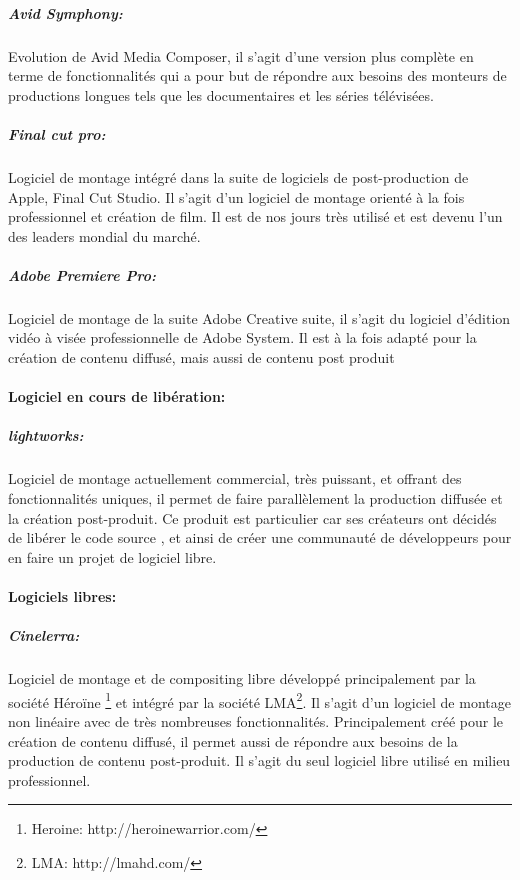 \subparagraph{Avid Symphony:}

Evolution de Avid Media Composer, il s'agit d'une version plus complète
en terme de fonctionnalités qui a pour but de répondre aux besoins
des monteurs de productions longues tels que les documentaires et les
séries télévisées.

\subparagraph{Final cut pro:}

Logiciel de montage intégré dans la suite de logiciels de
post-production de Apple, Final Cut Studio. Il s'agit d'un logiciel
de montage orienté à la fois professionnel et création de film. Il
est de nos jours très utilisé et est devenu l'un des leaders mondial
du marché.

\subparagraph{Adobe Premiere Pro:}

Logiciel de montage de la suite Adobe Creative suite, il s'agit du
logiciel d'édition vidéo à visée professionnelle de Adobe System. Il
est à la fois adapté pour la création de contenu diffusé, mais aussi
de contenu post produit

\paragraph {Logiciel en cours de libération:}

\subparagraph{lightworks:}

Logiciel de montage actuellement commercial, très puissant, et offrant
des fonctionnalités uniques, il permet de faire parallèlement la
production diffusée et la création post-produit. Ce produit est
particulier car ses créateurs ont décidés de libérer le code source
\cite{TheLightworksOpenSourceProjectStartHere}, et ainsi  de créer une
communauté de développeurs pour en faire un projet de logiciel libre.

\paragraph {Logiciels libres:}

\subparagraph{Cinelerra:}

Logiciel de montage et de compositing libre développé principalement
par la société Héroïne \footnote{Heroine: http://heroinewarrior.com/}
et intégré par la société LMA\footnote{LMA: http://lmahd.com/}. Il
s'agit d'un logiciel de montage non linéaire avec de très nombreuses
fonctionnalités. Principalement créé pour le création de contenu
diffusé, il permet aussi de répondre aux besoins de la production
de contenu post-produit. Il s'agit du seul logiciel libre utilisé en
milieu professionnel.


